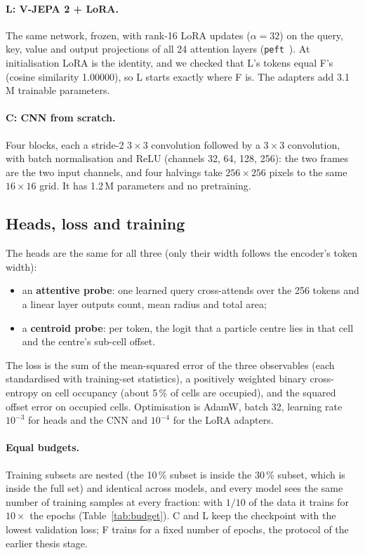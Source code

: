 \documentclass[11pt,a4paper]{article}
\newcommand{\F}{\textsf{F}}
\newcommand{\C}{\textsf{C}}
\newcommand{\Lo}{\textsf{L}}
\begin{document}
\paragraph{\Lo{}: V-JEPA 2 + LoRA.} The same network, frozen, with rank-16 LoRA updates
($\alpha=32$) on the query, key, value and output projections of all 24 attention
layers (\texttt{peft}~\cite{peft}). At initialisation LoRA is the identity, and we
checked that \Lo{}'s tokens equal \F{}'s (cosine similarity 1.00000), so \Lo{} starts
exactly where \F{} is. The adapters add 3.1\,M trainable parameters.

\paragraph{\C{}: CNN from scratch.} Four blocks, each a stride-2 $3\times3$
convolution followed by a $3\times3$ convolution, with batch normalisation and ReLU
(channels 32, 64, 128, 256): the two frames are the two input channels, and four halvings
take $256\times256$ pixels to the same $16\times16$ grid. It has 1.2\,M parameters and no
pretraining.

\subsection{Heads, loss and training}

The heads are the same for all three (only their width follows the encoder's token
width):
\begin{itemize}
  \item an \textbf{attentive probe}: one learned query cross-attends over the 256 tokens
        and a linear layer outputs count, mean radius and total area;
  \item a \textbf{centroid probe}: per token, the logit that a particle centre lies in
        that cell and the centre's sub-cell offset.
\end{itemize}
The loss is the sum of the mean-squared error of the three observables (each
standardised with training-set statistics), a positively weighted binary cross-entropy
on cell occupancy (about 5\,\% of cells are occupied), and the squared offset error on
occupied cells. Optimisation is AdamW, batch 32, learning rate $10^{-3}$ for heads and
the CNN and $10^{-4}$ for the LoRA adapters.

\paragraph{Equal budgets.} Training subsets are nested (the 10\,\% subset is inside the
30\,\% subset, which is inside the full set) and identical across models, and every
model sees the same number of training samples at every fraction: with $1/10$ of the
data it trains for $10\times$ the epochs (Table~\ref{tab:budget}). \C{} and \Lo{} keep
the checkpoint with the lowest validation loss; \F{} trains for a fixed number of epochs,
the protocol of the earlier thesis stage.
\end{document}

